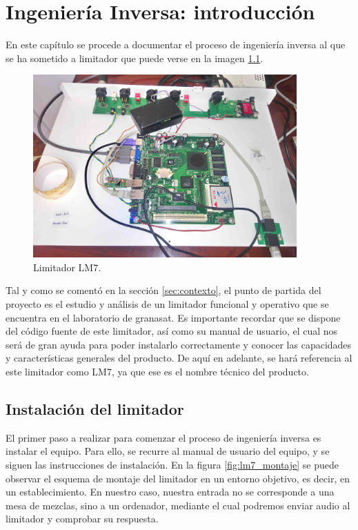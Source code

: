 \chapter{Ingeniería Inversa: introducción} \label{cap:capitulo3_I}

En este capítulo se procede a documentar el proceso de ingeniería inversa al que se ha sometido a limitador que puede verse en la imagen \ref{img:lms7_cls}.

\begin{figure}[h]
    \centering
    \includegraphics[width=0.9\textwidth]{imagenes/lm7-fotos/lms7.jpg}
    \caption{Limitador LM7.}
	\label{img:lms7_cls}
\end{figure}

Tal y como se comentó en la sección \ref{sec:contexto}, el punto de partida del proyecto es el estudio y análisis de un limitador funcional y operativo que se encuentra en el laboratorio de \gls{granasat}. Es importante recordar que se dispone del código fuente de este limitador, así como su manual de usuario, el cual nos será de gran ayuda para poder instalarlo correctamente y conocer las capacidades y características generales del producto. De aquí en adelante, se hará referencia al este limitador como \acrshort{LM7}, ya que ese es el nombre técnico del producto.

\section{Instalación del limitador}

El primer paso a realizar para comenzar el proceso de ingeniería inversa es instalar el equipo. Para ello, se recurre al manual de usuario del equipo, y se siguen las instrucciones de instalación. En la figura \ref{fig:lm7_montaje} se puede observar el esquema de montaje del limitador en un entorno objetivo, es decir, en un establecimiento. En nuestro caso, nuestra entrada no se corresponde a una mesa de mezclas, sino a un ordenador, mediante el cual podremos enviar audio al limitador y comprobar su respuesta.

